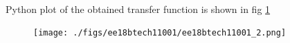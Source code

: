 \\ 
\\ \\
Python plot of the obtained transfer function is shown in fig \ref{fig:bode}
\begin{figure}[htp]
    \centering
    \texttt{[image: ./figs/ee18btech11001/ee18btech11001\_2.png]}
    \caption{}
    \label{fig:bode}
\end{figure}


%
%

